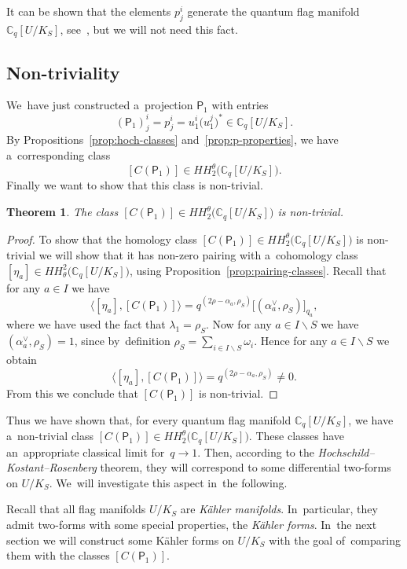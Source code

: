 \documentclass[10pt,a4paper]{amsart}
\numberwithin{equation}{section}
\newtheorem{Theorem}{Theorem}[section]
\newcommand{\Cqflag}{\mathbb{C}_q[U / K_S]}
\newcommand{\proj}{\mathsf{P}}
\begin{document}
\begin{Remark}
It can be shown that the elements $p^i_j$ generate the quantum flag manifold $\Cqflag$, see~\cite[Proposition~3.2]{heko06}, but we will not need this fact.
\end{Remark}

\subsection{Non-triviality}

We~have just constructed a~projection $\proj_1$ with entries
\[
(\proj_1)^i_j = p^i_j = u^i_1 \big(u^j_1\big)^* \in \Cqflag.
\]
By Propositions~\ref{prop:hoch-classes} and~\ref{prop:p-properties}, we have a~corresponding class
\[
[C(\proj_1)] \in HH^\theta_2\big(\Cqflag\big).
\]
Finally we want to show that this class is non-trivial.


\begin{Theorem}
The class $[C(\proj_1)] \in HH^\theta_2\big(\Cqflag\big)$ is non-trivial.
\end{Theorem}



\begin{proof}
To show that the homology class $[C(\proj_1)] \in HH^\theta_2\big(\Cqflag\big)$ is non-trivial we will show that it has non-zero pairing with a~cohomology class $[\eta_a] \in HH^2_\theta\big(\Cqflag\big)$, using Proposition~\ref{prop:pairing-classes}.
Recall that for any $a \in I$ we have
\[
\big\langle [\eta_a], [C(\proj_1)] \big\rangle = q^{(2 \rho - \alpha_a, \rho_S)}
\big[(\alpha_a^\vee, \rho_S)\big]_{q_a},
\]
where we have used the fact that $\lambda_1 = \rho_S$.
Now for any $a \in I \backslash S$ we have $(\alpha_a^\vee, \rho_S) = 1$, since by~definition $\rho_S = \sum_{i \in I \backslash S} \omega_i$.
Hence for any $a \in I \backslash S$ we obtain
\[
\big\langle [\eta_a], [C(\proj_1)] \big\rangle = q^{(2 \rho - \alpha_a, \rho_S)} \neq 0.
\]
From this we conclude that $[C(\proj_1)]$ is non-trivial.
\end{proof}


Thus we have shown that, for every quantum flag manifold $\Cqflag$, we have a~non-trivial class $[C(\proj_1)] \in HH^\theta_2\big(\Cqflag\big)$.
These classes have an~appropriate classical limit for~$q \to 1$.
Then, according to the \emph{Hoch\-schild--Kostant--Rosenberg} theorem, they will correspond to some differential two-forms on $U / K_S$.
We~will investigate this aspect in~the following.

Recall that all flag manifolds $U / K_S$ are \emph{K\"ahler manifolds}.
In~particular, they admit two-forms with some special properties, the \emph{K\"ahler forms}.
In~the next section we will construct some K\"ahler forms on $U / K_S$ with the goal of~comparing them with the classes $[C(\proj_1)]$.
\end{document}

